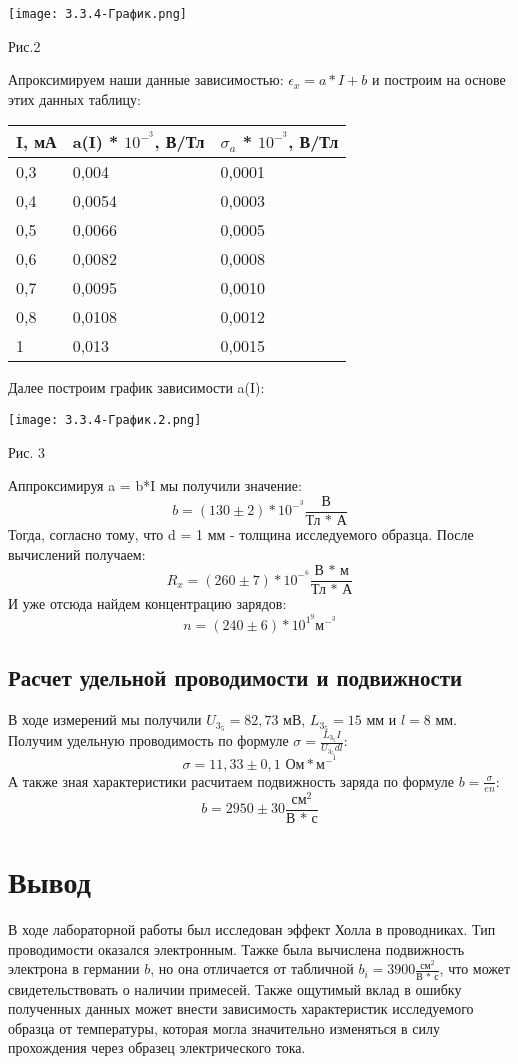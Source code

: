 \documentclass[a4paper, 12pt]{article}
\begin{document}
\begin{center}
    \texttt{[image: 3.3.4-График.png]}
    \caption{Рис.2}
    \label{fig:enter-label}
\end{center}
Апроксимируем наши данные зависимостью: $\epsilon_x = a * I + b$ и построим на основе этих данных таблицу: 
\begin{center}
\begin{tabular}{|l|l|l|}
\hline
I, мА & a(I) * $10^-^3$, В/Тл & $\sigma_a$ * $10^-^3$, В/Тл \\ \hline
0,3   & 0,004                 & 0,0001                    \\ \hline
0,4   & 0,0054                & 0,0003                    \\ \hline
0,5   & 0,0066                & 0,0005                    \\ \hline
0,6   & 0,0082                & 0,0008                    \\ \hline
0,7   & 0,0095                & 0,0010                    \\ \hline
0,8   & 0,0108                & 0,0012                    \\ \hline
1     & 0,013                 & 0,0015                    \\ \hline
\end{tabular}
\end{center}
Далее построим график зависимости a(I):
\begin{center}
    \texttt{[image: 3.3.4-График.2.png]}
    \caption{Рис. 3}
    \label{fig:enter-label}
\end{center}
Аппроксимируя a = b*I мы получили значение: 
$$b = (130 \pm 2) * 10^-^3 \frac{\text{В}}{\text{Тл * А}}$$
Тогда, согласно тому, что d = 1 мм - толщина исследуемого образца. После вычислений получаем:
$$R_x = (260 \pm 7) * 10^-^6 \frac{\text{В * м}}{\text{Тл * А}}$$
И уже отсюда найдем концентрацию зарядов:
$$n = (240 \pm 6) * 10^1^9 \text{м}^-^3$$
\subsection{Расчет удельной проводимости и подвижности}
В ходе измерений мы получили $U_3_5 = 82,73$ мВ, $L_3_5 = 15$ мм и $l = 8$ мм. Получим удельную проводимость по формуле $\sigma = \frac{L_3_5  I}{U_3_5  d  l}$:
$$\sigma = 11,33 \pm 0,1 \text{ Ом} * \text{м}^-^1$$
А также зная характеристики расчитаем подвижность заряда по формуле $b = \frac{\sigma}{e n}$:
$$b = 2950 \pm 30 \frac{ \text{см}^2}{\text{В * с}} $$
\section{Вывод}
В ходе лабораторной работы был исследован эффект Холла в проводниках. Тип проводимости оказался электронным. Тажке была вычислена подвижность электрона в германии $b$, но она отличается от табличной $b_i = 3900 \frac{ \text{см}^2}{\text{В * с}}$, что может свидетельствовать о наличии примесей. Также ощутимый вклад в ошибку полученных данных может внести зависимость характеристик исследуемого образца от температуры, которая могла значительно изменяться в силу
прохождения через образец электрического тока.
\end{document}
